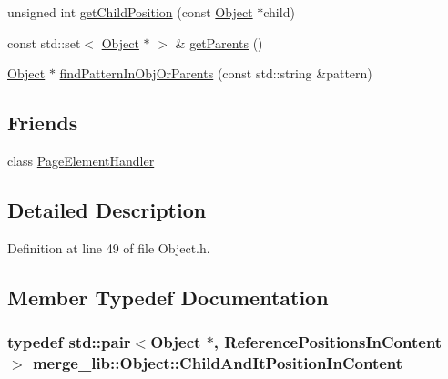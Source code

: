 \begin{DoxyCompactItemize}
\item 
unsigned int \hyperlink{classmerge__lib_1_1_object_ac703276c6c64aac17a6eebac1847b42c}{get\-Child\-Position} (const \hyperlink{classmerge__lib_1_1_object}{Object} $\ast$child)
\item 
const std\-::set$<$ \hyperlink{classmerge__lib_1_1_object}{Object} $\ast$ $>$ \& \hyperlink{classmerge__lib_1_1_object_a9b3e355749987384a93891dbd05e73c1}{get\-Parents} ()
\item 
\hyperlink{classmerge__lib_1_1_object}{Object} $\ast$ \hyperlink{classmerge__lib_1_1_object_a748cda680f3a23133864c0757ad7f058}{find\-Pattern\-In\-Obj\-Or\-Parents} (const std\-::string \&pattern)
\end{DoxyCompactItemize}
\subsection*{Friends}
\begin{DoxyCompactItemize}
\item 
class \hyperlink{classmerge__lib_1_1_object_a7caecd62368ebb263b1cf781d8d9c901}{Page\-Element\-Handler}
\end{DoxyCompactItemize}


\subsection{Detailed Description}


Definition at line 49 of file Object.\-h.



\subsection{Member Typedef Documentation}
\hypertarget{classmerge__lib_1_1_object_a61ce4ed189bafe56ea358abdeb25ad54}{
\subsubsection[{Child\-And\-It\-Position\-In\-Content}]{\setlength{\rightskip}{0pt plus 5cm}typedef std\-::pair$<${\bf Object} $\ast$, {\bf Reference\-Positions\-In\-Content} $>$ {\bf merge\-\_\-lib\-::\-Object\-::\-Child\-And\-It\-Position\-In\-Content}}}\label{d7/df1/classmerge__lib_1_1_object_a61ce4ed189bafe56ea358abdeb25ad54}


